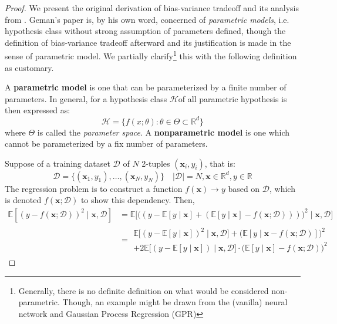 \documentclass[10pt]{article} %
\begin{document}
\begin{proof}
    We present the original derivation of bias-variance tradeoff and its analysis from \cite{6797087}. Geman's paper is, by his own word, concerned of \textit{parametric models}, i.e. hypothesis class without strong assumption of parameters defined, though the definition of bias-variance tradeoff afterward and its justification is made in the sense of parametric model. We partially clarify\footnote{Generally, there is no definite definition on what would be considered non-parametric. Though, an example might be drawn from the (vanilla) neural network and Gaussian Process Regression (GPR)} this with the following definition as customary. 

    \begin{definition}[Parameterization]
        A \textbf{parametric model} is one that can be parameterized by a finite number of parameters. In general, for a hypothesis class $\mathcal{H}$of all parametric hypothesis is then expressed as:
        \begin{equation}
            \mathcal{H} = \{f(x;\theta): \theta \in \Theta \subset \mathbb{R}^{d}\}
        \end{equation} where $\Theta$ is called the \textit{parameter space}. A \textbf{nonparametric model} is one which cannot be parameterized by a fix number of parameters.   
    \end{definition}
    Suppose of a training dataset $\mathcal{D}$ of $N$ 2-tuples $(\mathbf{x}_{i},y_{i})$, that is: \begin{equation}
        \mathcal{D} = \{(\mathbf{x}_{1},y_{1}),\dots,(\mathbf{x}_{N},y_{N})\} \quad \lvert \mathcal{D} \rvert = N, \mathbf{x}\in \mathbb{R}^{d}, y \in \mathbb{R}
    \end{equation}
    The regression problem is to construct a function $f(\mathbf{x})\to y$ based on $\mathcal{D}$, which is denoted $f(\mathbf{x};\mathcal{D})$ to show this dependency. Then, 
    \begin{equation}
        \begin{split}
            \mathbb{E}\left[ (y-f(\mathbf{x};\mathcal{D}))^{2}\mid \mathbf{x},\mathcal{D}\right] & = \mathbb{E}\Big[\big( (y-\mathbb{E}[y\mid \mathbf{x}]+ (\mathbb{E}[y\mid \mathbf{x}]-f(\mathbf{x};\mathcal{D}))) \big)^{2}\mid \mathbf{x},\mathcal{D}\Big]\\
            & = \begin{multlined}
                \mathbb{E} \Big[ (y- \mathbb{E}[y\mid \mathbf{x}])^{2}\mid \mathbf{x},\mathcal{D} \Big] + \Big(\mathbb{E}[y\mid \mathbf{x}-f(\mathbf{x};\mathcal{D})]\Big)^{2} \\ + 2\mathbb{E} \big[(y-\mathbb{E}[y\mid \mathbf{x}])\mid \mathbf{x},\mathcal{D}\big]\cdot \big(\mathbb{E}[y\mid \mathbf{x}]-f(\mathbf{x;\mathcal{D}})\big)^{2} 

\end{multlined}
\end{split}
\end{equation}
\end{proof}
\end{document}
